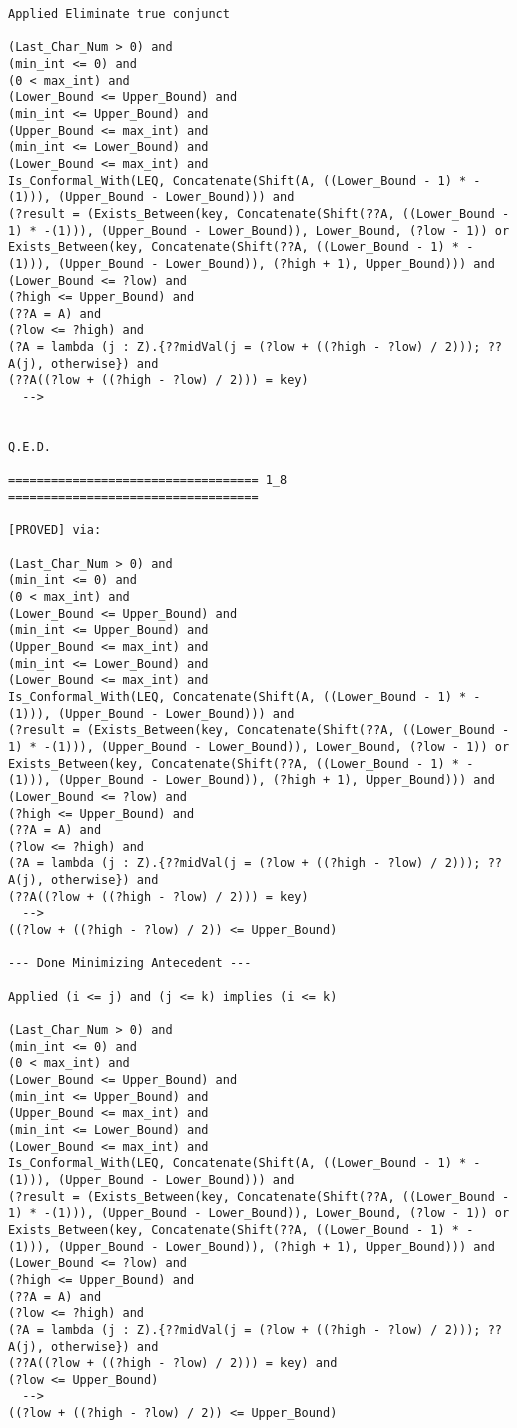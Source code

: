 \begin{lstlisting}[language=resolve]
Applied Eliminate true conjunct

(Last_Char_Num > 0) and
(min_int <= 0) and
(0 < max_int) and
(Lower_Bound <= Upper_Bound) and
(min_int <= Upper_Bound) and
(Upper_Bound <= max_int) and
(min_int <= Lower_Bound) and
(Lower_Bound <= max_int) and
Is_Conformal_With(LEQ, Concatenate(Shift(A, ((Lower_Bound - 1) * -(1))), (Upper_Bound - Lower_Bound))) and
(?result = (Exists_Between(key, Concatenate(Shift(??A, ((Lower_Bound - 1) * -(1))), (Upper_Bound - Lower_Bound)), Lower_Bound, (?low - 1)) or Exists_Between(key, Concatenate(Shift(??A, ((Lower_Bound - 1) * -(1))), (Upper_Bound - Lower_Bound)), (?high + 1), Upper_Bound))) and
(Lower_Bound <= ?low) and
(?high <= Upper_Bound) and
(??A = A) and
(?low <= ?high) and
(?A = lambda (j : Z).{??midVal(j = (?low + ((?high - ?low) / 2))); ??A(j), otherwise}) and
(??A((?low + ((?high - ?low) / 2))) = key)
  -->


Q.E.D.

=================================== 1_8 ===================================

[PROVED] via:

(Last_Char_Num > 0) and
(min_int <= 0) and
(0 < max_int) and
(Lower_Bound <= Upper_Bound) and
(min_int <= Upper_Bound) and
(Upper_Bound <= max_int) and
(min_int <= Lower_Bound) and
(Lower_Bound <= max_int) and
Is_Conformal_With(LEQ, Concatenate(Shift(A, ((Lower_Bound - 1) * -(1))), (Upper_Bound - Lower_Bound))) and
(?result = (Exists_Between(key, Concatenate(Shift(??A, ((Lower_Bound - 1) * -(1))), (Upper_Bound - Lower_Bound)), Lower_Bound, (?low - 1)) or Exists_Between(key, Concatenate(Shift(??A, ((Lower_Bound - 1) * -(1))), (Upper_Bound - Lower_Bound)), (?high + 1), Upper_Bound))) and
(Lower_Bound <= ?low) and
(?high <= Upper_Bound) and
(??A = A) and
(?low <= ?high) and
(?A = lambda (j : Z).{??midVal(j = (?low + ((?high - ?low) / 2))); ??A(j), otherwise}) and
(??A((?low + ((?high - ?low) / 2))) = key)
  -->
((?low + ((?high - ?low) / 2)) <= Upper_Bound)

--- Done Minimizing Antecedent ---

Applied (i <= j) and (j <= k) implies (i <= k)

(Last_Char_Num > 0) and
(min_int <= 0) and
(0 < max_int) and
(Lower_Bound <= Upper_Bound) and
(min_int <= Upper_Bound) and
(Upper_Bound <= max_int) and
(min_int <= Lower_Bound) and
(Lower_Bound <= max_int) and
Is_Conformal_With(LEQ, Concatenate(Shift(A, ((Lower_Bound - 1) * -(1))), (Upper_Bound - Lower_Bound))) and
(?result = (Exists_Between(key, Concatenate(Shift(??A, ((Lower_Bound - 1) * -(1))), (Upper_Bound - Lower_Bound)), Lower_Bound, (?low - 1)) or Exists_Between(key, Concatenate(Shift(??A, ((Lower_Bound - 1) * -(1))), (Upper_Bound - Lower_Bound)), (?high + 1), Upper_Bound))) and
(Lower_Bound <= ?low) and
(?high <= Upper_Bound) and
(??A = A) and
(?low <= ?high) and
(?A = lambda (j : Z).{??midVal(j = (?low + ((?high - ?low) / 2))); ??A(j), otherwise}) and
(??A((?low + ((?high - ?low) / 2))) = key) and
(?low <= Upper_Bound)
  -->
((?low + ((?high - ?low) / 2)) <= Upper_Bound)


\end{lstlisting}
